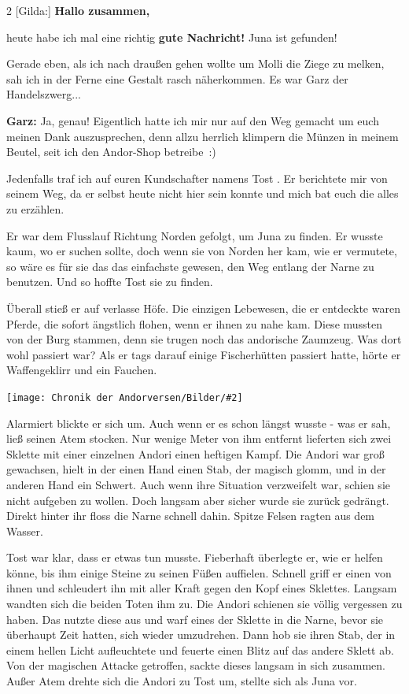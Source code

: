 \documentclass[10pt, a4paper, oneside]{book}
\newcommand{\bildmitts}[2][height=0.32\textwidth,width=0.48\textwidth,keepaspectratio]{%
    \begin{center}
        \texttt{[image: Chronik der Andorversen/Bilder/\#2]}
    \end{center}
}
\begin{document}
\begin{multicols}{2}
[Gilda:] \textbf{Hallo zusammen,}

heute habe ich mal eine richtig \textbf{gute Nachricht!} Juna ist gefunden!

Gerade eben, als ich nach draußen gehen wollte um Molli die Ziege zu melken, sah ich in der Ferne eine Gestalt rasch näherkommen. Es war Garz der Handelszwerg...

\textbf{Garz:} Ja, genau! Eigentlich hatte ich mir nur auf den Weg gemacht um euch meinen Dank auszusprechen, denn allzu herrlich klimpern die Münzen in meinem Beutel, seit ich den Andor-Shop betreibe :)

Jedenfalls traf ich auf euren Kundschafter namens Tost . Er berichtete mir von seinem Weg, da er selbst heute nicht hier sein konnte und mich bat euch die alles zu erzählen.

Er war dem Flusslauf Richtung Norden gefolgt, um Juna zu finden. Er wusste kaum, wo er suchen sollte, doch wenn sie von Norden her kam, wie er vermutete, so wäre es für sie das das einfachste gewesen, den Weg entlang der Narne zu benutzen. Und so hoffte Tost sie zu finden.

Überall stieß er auf verlasse Höfe. Die einzigen Lebewesen, die er entdeckte waren Pferde, die sofort ängstlich flohen, wenn er ihnen zu nahe kam. Diese mussten von der Burg stammen, denn sie trugen noch das andorische Zaumzeug. Was dort wohl passiert war? Als er tags darauf einige Fischerhütten passiert hatte, hörte er Waffengeklirr und ein Fauchen.

\bildmitts{AA2016 Juna ist gefunden 1.jpeg}

Alarmiert blickte er sich um. Auch wenn er es schon längst wusste - was er sah, ließ seinen Atem stocken. Nur wenige Meter von ihm entfernt lieferten sich zwei Sklette mit einer einzelnen Andori einen heftigen Kampf. Die Andori war groß gewachsen, hielt in der einen Hand einen Stab, der magisch glomm, und in der anderen Hand ein Schwert. Auch wenn ihre Situation verzweifelt war, schien sie nicht aufgeben zu wollen. Doch langsam aber sicher wurde sie zurück gedrängt. Direkt hinter ihr floss die Narne schnell dahin. Spitze Felsen ragten aus dem Wasser.

Tost war klar, dass er etwas tun musste. Fieberhaft überlegte er, wie er helfen könne, bis ihm einige Steine zu seinen Füßen auffielen. Schnell griff er einen von ihnen und schleudert ihn mit aller Kraft gegen den Kopf eines Sklettes. Langsam wandten sich die beiden Toten ihm zu. Die Andori schienen sie völlig vergessen zu haben. Das nutzte diese aus und warf eines der Sklette in die Narne, bevor sie überhaupt Zeit hatten, sich wieder umzudrehen. Dann hob sie ihren Stab, der in einem hellen Licht aufleuchtete und feuerte einen Blitz auf das andere Sklett ab. Von der magischen Attacke getroffen, sackte dieses langsam in sich zusammen. Außer Atem drehte sich die Andori zu Tost um, stellte sich als Juna vor.


\end{multicols}
\end{document}
